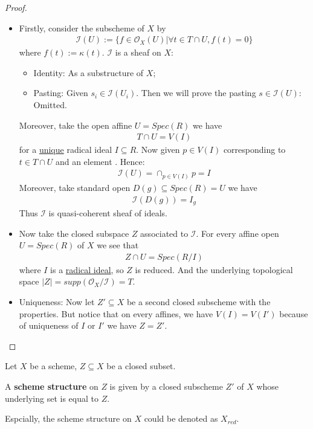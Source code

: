 \documentclass[Total.tex]{subfiles}
\begin{document}
			\begin{proof}
				\begin{itemize}
					\item Firstly, consider the subscheme of $X$ by
					\begin{gather*}
						\mathcal{I}(U):=\{f\in \mathcal{O}_X(U)|\forall t\in T\cap U,f(t)=0\}
					\end{gather*}
					where $f(t):=\kappa(t)$. $\mathcal{I}$ is a sheaf on $X$:
					\begin{itemize}
						\item Identity: As a substructure of $X$;
						\item Pasting: Given $s_i\in \mathcal{I}(U_i)$. Then we will prove the pasting $s\in \mathcal{I}(U)$: Omitted.
					\end{itemize}
					Moreover, take the open affine $U=Spec(R)$ we have
					\begin{gather*}
						T\cap U=V(I)
					\end{gather*}
					for a \underline{unique} radical ideal $I\subseteq R$. Now given $p\in V(I)$ corresponding to $t\in T\cap U$ and an element . Hence:
					\begin{gather*}
						\mathcal{I}(U)=\cap_{p\in V(I)} p=I
					\end{gather*}
					Moreover, take standard open $D(g)\subseteq Spec(R)=U$ we have
					\begin{gather*}
						\mathcal{I}(D(g))=I_g
					\end{gather*}
					Thus $\mathcal{I}$ is quasi-coherent sheaf of ideals.
					\item Now take the closed subspace $Z$ associated to $\mathcal{I}$. For every affine open $U=Spec(R)$ of $X$ we see that
					\begin{gather*}
						Z\cap U=Spec(R/I)
					\end{gather*}
					where $I$ is a \underline{radical ideal}, so $Z$ is reduced. And the underlying topological space $|Z|=supp(\mathcal{O}_X/\mathcal{I})=T$.
					
					\item Uniqueness: Now let $Z'\subseteq X$ be a second closed subscheme with the properties. But notice that on every affines, we have $V(I)=V(I')$ because of uniqueness of $I$ or $I'$ we have $Z=Z'$.
				\end{itemize}
			\end{proof}
			
			\begin{Def}
				Let $X$ be a scheme, $Z\subseteq X$ be a closed subset. 
				
				A \textbf{scheme structure} on $Z$ is given by a closed subscheme $Z'$ of $X$ whose underlying set is equal to $Z$. 
				
				Espcially, the scheme structure on $X$ could be denoted as $X_{red}$.
			\end{Def}
			
\end{document}
